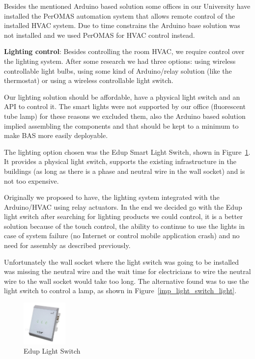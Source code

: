\documentclass[conference]{IEEEtran}
\begin{document}
Besides the mentioned Arduino based solution some offices in our University have installed the PerOMAS automation system that allows remote control of the installed HVAC system. Due to time constrains the Arduino base solution was not installed and we used PerOMAS for HVAC control instead.





\textbf{Lighting control}:
Besides controlling the room \ac{HVAC}, we require control over the lighting system. After some research we had three options: using wireless controllable light bulbs, using some kind of Arduino/relay solution (like the thermostat) or using a wireless controllable light switch.

Our lighting solution should be affordable, have a physical light switch and an API to control it. The smart lights were not supported by our office (fluorescent tube lamp) for these reasons we excluded them, also the Arduino based solution implied assembling the components and that should be kept to a minimum to make BAS more easily deployable.

The lighting option chosen was the Edup Smart Light Switch, shown in Figure~\ref{edup_light_imp}.  It provides a physical light switch, supports the existing infrastructure in the buildings (as long as there is a phase and neutral wire in the wall socket) and is not too expensive.


Originally we proposed to have, the lighting system integrated with the Arduino/\ac{HVAC} using relay actuators. In the end we decided go with the Edup light switch after searching for lighting products we could control, it is a better solution because of the touch control, the ability to continue to use the lights in case of system failure (no Internet or control mobile application crash) and no need for assembly as described previously.

Unfortunately the wall socket where the light switch was going to be installed was missing the neutral wire and the wait time for electricians to wire the neutral wire to the wall socket would take too long. The alternative found was to use the light switch to control a lamp, as shown in Figure~\ref{imp_light_switch_light}.

\begin{figure}[htbp]
\centering
\includegraphics[width=0.2\textwidth]{Figures/edup_light}
\caption{Edup Light Switch}
\label{edup_light_imp}
\end{figure}
\end{document}
